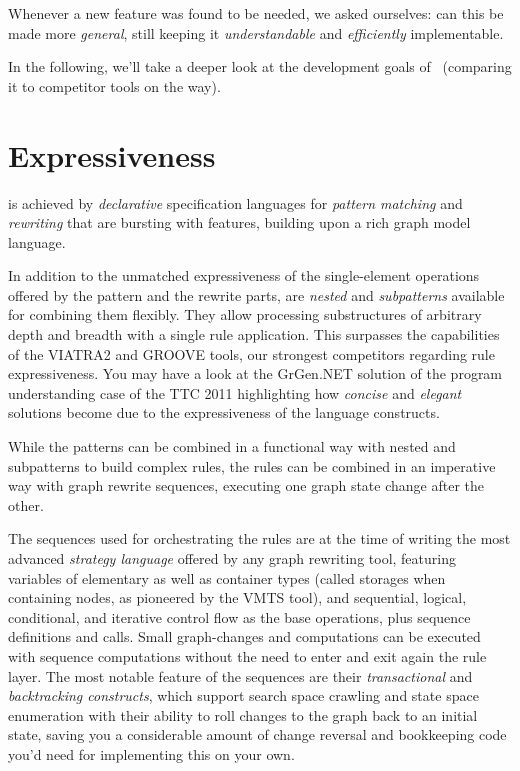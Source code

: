 Whenever a new feature was found to be needed, we asked ourselves: can this be made more \emph{general}, still keeping it \emph{understandable} and \emph{efficiently} implementable.
 
In the following, we'll take a deeper look at the development goals of \GrG\ (comparing it to competitor tools on the way).

\section{Expressiveness}
is achieved by \emph{declarative} specification languages for \emph{pattern matching} and \emph{rewriting} that are bursting with features, building upon a rich graph model language.

In addition to the unmatched expressiveness of the single-element operations offered by the pattern and the rewrite parts,
are \emph{nested} and \emph{subpatterns} available for combining them flexibly.
They allow processing substructures of arbitrary depth and breadth with a single rule application.
This surpasses the capabilities of the VIATRA2\cite{viatra2,recursiveviatra} and GROOVE \cite{Groove} tools, our strongest competitors regarding rule expressiveness.
You may have a look at the GrGen.NET solution of the program understanding case \cite{ProgramUnderstanding} of the TTC 2011 highlighting how \emph{concise} and \emph{elegant} solutions become due to the expressiveness of the language constructs.

While the patterns can be combined in a functional way with nested and subpatterns to build complex rules, the rules can be combined in an imperative way with graph rewrite sequences, executing one graph state change after the other.

The sequences used for orchestrating the rules are at the time of writing the most advanced \emph{strategy language} offered by any graph rewriting tool, featuring variables of elementary as well as container types (called storages when containing nodes, as pioneered by the VMTS\cite{vmts} tool), and sequential, logical, conditional, and iterative control flow as the base operations, plus sequence definitions and calls.
Small graph-changes and computations can be executed with sequence computations without the need to enter and exit again the rule layer.
The most notable feature of the sequences are their \emph{transactional} and \emph{backtracking constructs}, which support search space crawling and state space enumeration with their ability to roll changes to the graph back to an initial state, saving you a considerable amount of change reversal and bookkeeping code you'd need for implementing this on your own.

